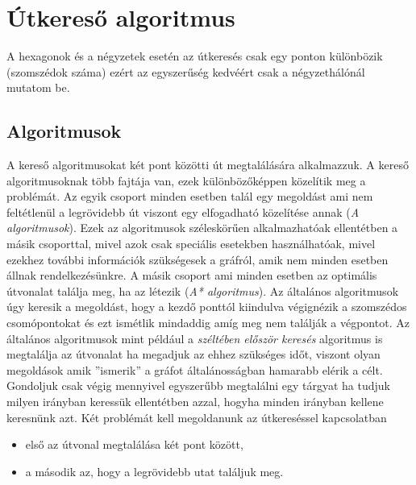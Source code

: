 \chapter{Útkereső algoritmus}

A hexagonok és a négyzetek esetén az útkeresés csak egy ponton különbözik (szomszédok száma) ezért az egyszerűség kedvéért csak a négyzethálónál mutatom be.

\section{Algoritmusok}

A kereső algoritmusokat két pont közötti út megtalálására alkalmazzuk. 
A kereső algoritmusoknak több fajtája van, ezek különbözőképpen közelítik meg a problémát. 
\newline
\newline Az egyik csoport minden esetben talál egy megoldást ami nem feltétlenül a legrövidebb út viszont egy elfogadható közelítése annak (\textit{A algoritmusok}). Ezek az algoritmusok széleskörűen alkalmazhatóak ellentétben a másik csoporttal, mivel azok csak speciális esetekben használhatóak, mivel ezekhez további információk szükségesek a gráfról, amik nem minden esetben állnak rendelkezésünkre.
\newline A másik csoport ami minden esetben az optimális útvonalat találja meg, ha az létezik (\textit{A* algoritmus}).
\newline
\newline Az általános algoritmusok úgy keresik a megoldást, hogy a kezdő ponttól kiindulva végignézik a szomszédos csomópontokat és ezt ismétlik mindaddig amíg meg nem találják a végpontot. Az általános algoritmusok mint például a \textit{széltében először keresés} algoritmus is megtalálja az útvonalat ha megadjuk az ehhez szükséges időt, viszont olyan megoldások amik ''ismerik'' a gráfot általánosságban hamarabb elérik a célt. Gondoljuk csak végig mennyivel egyszerűbb megtalálni egy tárgyat ha tudjuk milyen irányban keressük ellentétben azzal, hogyha minden irányban kellene keresnünk azt.
\newline
\newline Két problémát kell megoldanunk az útkereséssel kapcsolatban 
\begin{itemize}
\item első az útvonal megtalálása két pont között, 
\item a második az, hogy a legrövidebb utat találjuk meg. 
\end{itemize}

